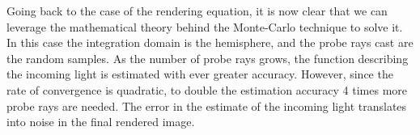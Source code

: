 \documentclass{PoliMi_MasterThesis}
\begin{document}
Going back to the case of the rendering equation, it is now clear that we can leverage the mathematical theory behind the Monte-Carlo technique to solve it. In this case the integration domain is the hemisphere, and the probe rays cast are the random samples. As the number of probe rays grows, the function describing the incoming light is estimated with ever greater accuracy. However, since the rate of convergence is quadratic, to double the estimation accuracy 4 times more probe rays are needed. The error in the estimate of the incoming light translates into noise in the final rendered image.

\begin{figure}[H]
    \centering
	\qquad
\end{figure}
\end{document}
